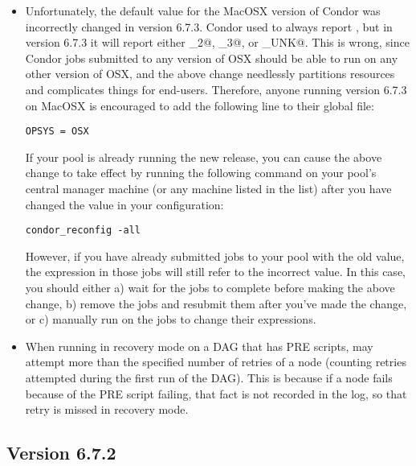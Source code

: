 \begin{itemize}

\item Unfortunately, the default  value for the MacOSX
  version of Condor was incorrectly changed in version 6.7.3.
  Condor used to always report \verb@OSX@, but in version 6.7.3 it
  will report either _2@, _3@, or
  \verb@OSX_UNK@.
  This is wrong, since Condor jobs submitted to any version of OSX
  should be able to run on any other version of OSX, and the above
  change needlessly partitions resources and complicates things for
  end-users.
  Therefore, anyone running version 6.7.3 on MacOSX is encouraged to
  add the following line to their global  file:
\begin{verbatim}
OPSYS = OSX
\end{verbatim}

  If your pool is already running the new release, you can cause the
  above change to take effect by running the following command on your
  pool's central manager machine (or any machine listed in the
   list) after you have changed the
   value in your configuration:
\begin{verbatim}
condor_reconfig -all
\end{verbatim}

  However, if you have already submitted jobs to your pool with the
  old  value, the  expression in
  those jobs will still refer to the incorrect value.
  In this case, you should either a) wait for the jobs to complete
  before making the above change, b) remove the jobs and resubmit
  them after you've made the change, or c) manually run 
  on the jobs to change their  expressions.

\item When running in recovery mode on a DAG that has PRE scripts,
 may attempt more than the specified number of retries
of a node (counting retries attempted during the first run of the
DAG).  This is because if a node fails because of the PRE script
failing, that fact is not recorded in the log, so that retry is missed
in recovery mode.

\end{itemize}



\subsection{\label{sec:New-6-7-2}Version 6.7.2}


